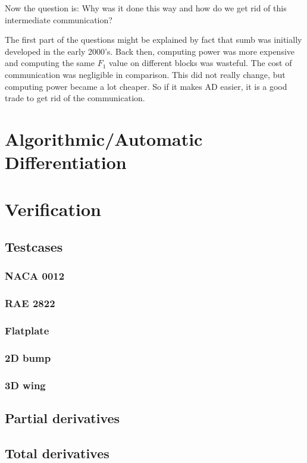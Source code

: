 Now the question is: Why was it done this way and how do we get rid of this
intermediate communication?

The first part of the questions might be explained by fact that sumb was
initially developed in the early 2000's. Back then, computing power was more
expensive and computing the same $F_1$ value on different blocks was
wasteful. The cost of communication was negligible in comparison. This did not
really change, but computing power became a lot cheaper. So if it makes AD
easier, it is a good trade to get rid of the communication.

\section{Algorithmic/Automatic Differentiation}

\section{Verification}

\subsection{Testcases}

\subsubsection{NACA 0012}
\subsubsection{RAE 2822}
\subsubsection{Flatplate}
\subsubsection{2D bump}
\subsubsection{3D wing}


\subsection{Partial derivatives}

\subsection{Total derivatives}


